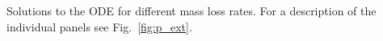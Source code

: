 Solutions to the ODE for different mass loss rates. For a description of the individual panels see Fig.~\ref{fig:p_ext}.